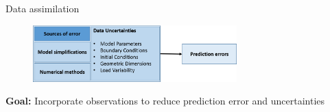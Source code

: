 \documentclass[aspectratio=169]{beamer} %
\begin{document}
\begin{frame}{Data assimilation}
    \begin{figure}
        \centering
        \includegraphics[width=0.7\textwidth]{../../conference/images/source_of_uncertainties.png}
    \end{figure}

    \textbf{Goal:} Incorporate observations to reduce prediction error and uncertainties
    \begin{figure}
        \centering
    \end{figure}

    \vfill
\end{frame}
\end{document}
